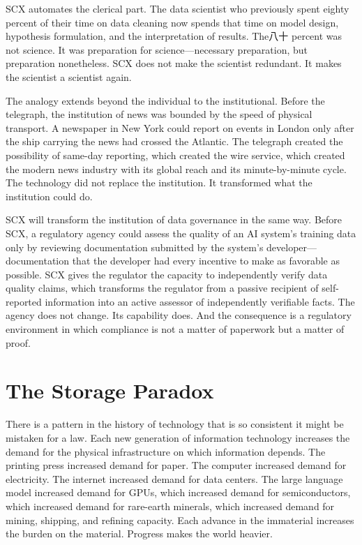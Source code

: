 \documentclass[12pt,a4paper]{article}
\begin{document}
SCX automates the clerical part. The data scientist who previously spent eighty percent of their time on data cleaning now spends that time on model design, hypothesis formulation, and the interpretation of results. The八十 percent was not science. It was preparation for science---necessary preparation, but preparation nonetheless. SCX does not make the scientist redundant. It makes the scientist a scientist again.

The analogy extends beyond the individual to the institutional. Before the telegraph, the institution of news was bounded by the speed of physical transport. A newspaper in New York could report on events in London only after the ship carrying the news had crossed the Atlantic. The telegraph created the possibility of same-day reporting, which created the wire service, which created the modern news industry with its global reach and its minute-by-minute cycle. The technology did not replace the institution. It transformed what the institution could do.

SCX will transform the institution of data governance in the same way. Before SCX, a regulatory agency could assess the quality of an AI system's training data only by reviewing documentation submitted by the system's developer---documentation that the developer had every incentive to make as favorable as possible. SCX gives the regulator the capacity to independently verify data quality claims, which transforms the regulator from a passive recipient of self-reported information into an active assessor of independently verifiable facts. The agency does not change. Its capability does. And the consequence is a regulatory environment in which compliance is not a matter of paperwork but a matter of proof.

\section{The Storage Paradox}

There is a pattern in the history of technology that is so consistent it might be mistaken for a law. Each new generation of information technology increases the demand for the physical infrastructure on which information depends. The printing press increased demand for paper. The computer increased demand for electricity. The internet increased demand for data centers. The large language model increased demand for GPUs, which increased demand for semiconductors, which increased demand for rare-earth minerals, which increased demand for mining, shipping, and refining capacity. Each advance in the immaterial increases the burden on the material. Progress makes the world heavier.
\end{document}
